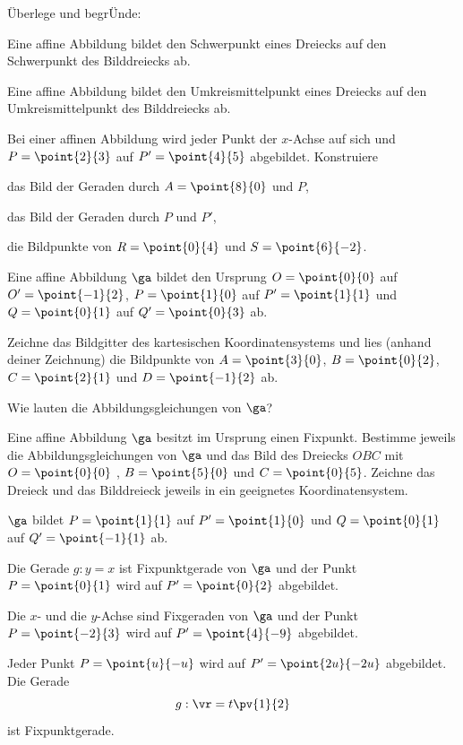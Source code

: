 \documentclass[%
11pt,%
twoside,%
titlepage,%
german,%
headsepline%
]{scrartcl}
\begin{document}
\begin{ueb}
\"Uberlege und begr\"Unde:
\begin{enumeratea}
\item Eine affine Abbildung bildet den Schwerpunkt eines Dreiecks auf den Schwerpunkt des Bilddreiecks ab.
\item Eine affine Abbildung bildet den Umkreismittelpunkt eines Dreiecks auf den Umkreismittelpunkt des Bilddreiecks ab.
\end{enumeratea}

\end{ueb}

\begin{ueb}
Bei einer affinen Abbildung wird jeder Punkt der $x$-Achse auf sich und $P=\point{2}{3}$ auf $P'=\point{4}{5}$ abgebildet. Konstruiere
\begin{enumeratea}
\item das Bild der Geraden durch $A=\point{8}{0}$ und $P$,
\item das Bild der Geraden durch $P$ und $P'$,
\item die Bildpunkte von $R=\point{0}{4}$ und $S=\point{6}{-2}$.
\end{enumeratea}
\end{ueb}

\begin{ueb}
Eine affine Abbildung $\ga$ bildet den Ursprung $O=\point{0}{0}$ auf $O'=\point{-1}{2}$, $P =\point{1}{0}$ auf
$P'=\point{1}{1}$ und $Q=\point{0}{1}$ auf $Q'=\point{0}{3}$ ab.
\begin{enumeratea}
\item Zeichne das Bildgitter des kartesischen Koordinatensystems und lies (anhand deiner
Zeichnung) die Bildpunkte von $A=\point{3}{0}$, $B=\point{0}{2}$, $C=\point{2}{1}$ und $D=\point{-1}{2}$ ab.
\item Wie lauten die Abbildungsgleichungen von $\ga$?
\end{enumeratea}
\end{ueb}

\begin{ueb}
Eine affine Abbildung $\ga$ besitzt im Ursprung einen Fixpunkt. Bestimme jeweils die Abbildungsgleichungen von $\ga$ und das Bild des Dreiecks $OBC$ mit $O = \point{0}{0}$ , $B = \point{5}{0}$ und $C = \point{0}{5}$. Zeichne das Dreieck und das Bilddreieck jeweils in ein geeignetes Koordinatensystem.
\begin{enumeratea}
\item $\ga$ bildet $P =\point{1}{1}$ auf $P' =\point{1}{0}$ und $Q=\point{0}{1}$ auf $Q' =\point{-1}{1}$ ab.
\item Die Gerade $g : y = x$ ist Fixpunktgerade von $\ga$ und der Punkt $P = \point{0}{1}$ wird auf $P'=\point{0}{2}$ abgebildet.
\item Die $x$- und die $y$-Achse sind Fixgeraden von $\ga$ und der Punkt $P = \point{-2}{3}$ wird auf $P'=\point{4}{-9}$ abgebildet.
\item Jeder Punkt $P = \point{u}{-u}$ wird auf $P' = \point{2u}{-2u}$ abgebildet. Die Gerade
$$g :\vr = t\pv{1}{2}$$
ist Fixpunktgerade.
\end{enumeratea}
\end{ueb}
\end{document}
